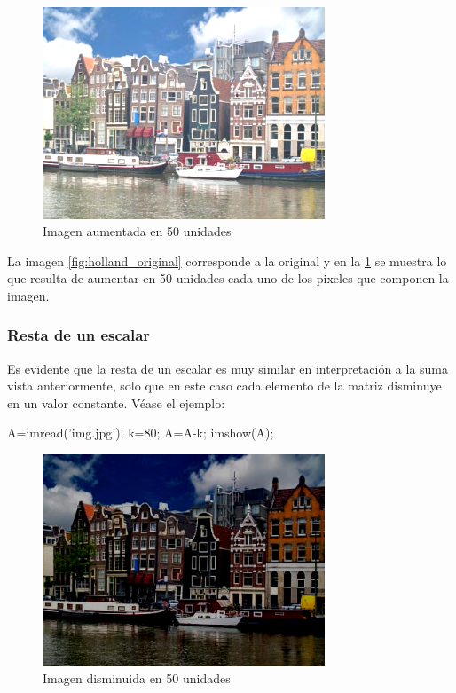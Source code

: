 \begin{figure}[htbp]
    \centering
    \includegraphics[width=0.75\textwidth]{images/ch7/holland_mas50.png}
    \caption{Imagen aumentada en 50 unidades}
    \label{fig:holland_mas50}
\end{figure}

La imagen \ref{fig:holland_original} corresponde a la original y en
la \ref{fig:holland_mas50} se muestra lo que resulta de aumentar
en 50 unidades cada uno de los pixeles que componen la imagen.

\subsubsection{Resta de un escalar}

Es evidente que la resta de un escalar es muy similar en interpretación
a la suma vista anteriormente, solo que en este caso cada elemento de la
matriz disminuye en un valor constante. Véase el ejemplo:

\begin{matlab}
A=imread('img.jpg');
k=80;
A=A-k;
imshow(A);
\end{matlab}

\begin{figure}[htbp]
    \centering
    \includegraphics[width=0.75\textwidth]{images/ch7/holland_menos50.png}
    \caption{Imagen disminuida en 50 unidades}
    \label{fig:holland_menos50}
\end{figure}

